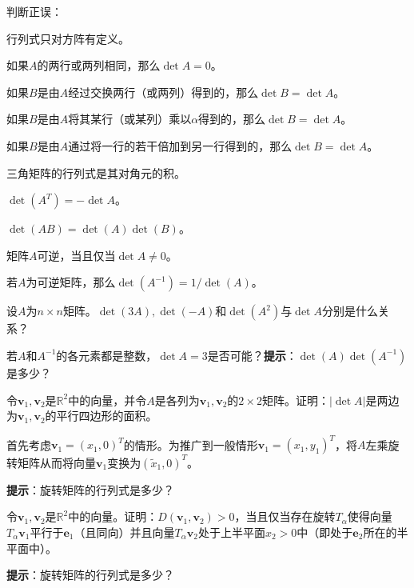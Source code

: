 \begin{probenumerate}
  \item 判断正误：
  \begin{probenumerate}
    \item 行列式只对方阵有定义。
    \item 如果$A$的两行或两列相同，那么$\det A=0$。
    \item 如果$B$是由$A$经过交换两行（或两列）得到的，那么$\det B=\det A$。
    \item 如果$B$是由$A$将其某行（或某列）乘以$\alpha$得到的，那么$\det B=\det A$。
    \item 如果$B$是由$A$通过将一行的若干倍加到另一行得到的，那么$\det B=\det A$。
    \item 三角矩阵的行列式是其对角元的积。
    \item $\det (A^T)=-\det A$。
    \item $\det (AB)=\det(A)\det (B)$。
    \item 矩阵$A$可逆，当且仅当$\det A\ne 0$。
    \item 若$A$为可逆矩阵，那么$\det (A^{-1})=1/\det(A)$。
  \end{probenumerate}
  \item 设$A$为$n\times n$矩阵。$\det (3A),\det (-A)$和$\det (A^{2})$与$\det A$分别是什么关系？
  \item 若$A$和$A^{-1}$的各元素都是整数，$\det A=3$是否可能？{\bf 提示}：$\det(A)\det(A^{-1})$是多少？
  \item 令$\mathbf{v}_1,\mathbf{v}_2$是$\mathbb{R}^2$中的向量，并令$A$是各列为$\mathbf{v}_1,\mathbf{v}_2$的$2\times 2$矩阵。证明：$|\det A|$是两边为$\mathbf{v}_1,\mathbf{v}_2$的平行四边形的面积。
  
  首先考虑$\mathbf{v}_1=(x_1,0)^T$的情形。为推广到一般情形$\mathbf{v}_1=(x_1,y_1)^T$，将$A$左乘旋转矩阵从而将向量$\mathbf{v}_1$变换为$(\widetilde{x}_1,0)^T$。
  
  {\bf 提示}：旋转矩阵的行列式是多少？
\end{probenumerate}


\begin{probenumerate}[start=5]
  \item 令$\mathbf{v}_1,\mathbf{v}_2$是$\mathbb{R}^2$中的向量。证明：$D(\mathbf{v}_1,\mathbf{v}_2)>0$，当且仅当存在旋转$T_\alpha$使得向量$T_\alpha\mathbf{v}_1$平行于$\mathbf{e}_1$（且同向）并且向量$T_\alpha\mathbf{v}_2$处于上半平面$x_2>0$中（即处于$\mathbf{e}_2$所在的半平面中）。
  
  {\bf 提示}：旋转矩阵的行列式是多少？
\end{probenumerate}